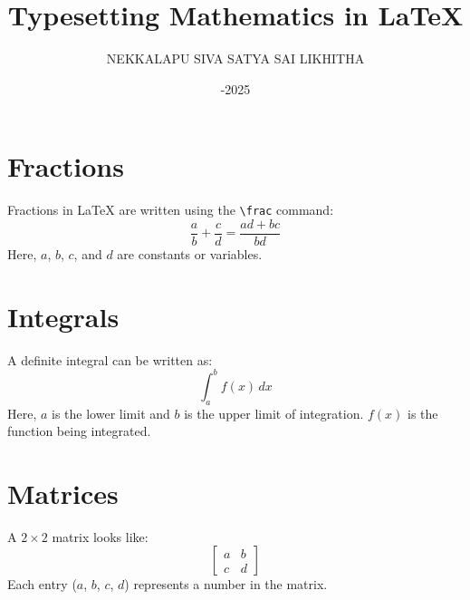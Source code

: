 \documentclass{article}
\title{Typesetting Mathematics in LaTeX}
\author{NEKKALAPU SIVA SATYA SAI LIKHITHA}
\date{\8-08-2025}
\begin{document}
\maketitle

\section*{Fractions}
Fractions in LaTeX are written using the \verb|\frac| command:
\[
\frac{a}{b} + \frac{c}{d} = \frac{ad + bc}{bd}
\]
Here, $a$, $b$, $c$, and $d$ are constants or variables.

\section*{Integrals}
A definite integral can be written as:
\[
\int_a^b f(x) \, dx
\]
Here, $a$ is the lower limit and $b$ is the upper limit of integration. $f(x)$ is the function being integrated.

\section*{Matrices}
A $2 \times 2$ matrix looks like:
\[
\begin{bmatrix}
a & b \\
c & d
\end{bmatrix}
\]
Each entry ($a$, $b$, $c$, $d$) represents a number in the matrix.
\end{document}
